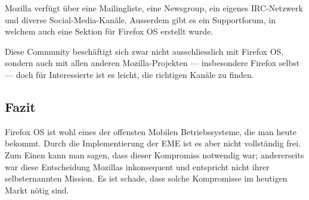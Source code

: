 Mozilla verfügt über eine Mailingliste\thinspace\cite{online:mozilla-mailinglist}, eine Newsgroup\thinspace\cite{online:mozilla-community}, ein eigenes \mbox{IRC-Netzwerk}\thinspace\cite{online:mozilla-community} und diverse \mbox{Social-Media-Kanäle}\thinspace\cite{online:mozilla-google-group}\thinspace\cite{online:mozilla-twitter}. Ausserdem gibt es ein Supportforum\thinspace\cite{online:mozilla-support}, in welchem auch eine Sektion für Firefox OS erstellt wurde. 

Diese Community beschäftigt sich zwar nicht ausschliesslich mit Firefox OS, sondern auch mit allen anderen Mozilla-Projekten --- insbesondere Firefox selbst --- doch für Interessierte ist es leicht, die richtigen Kanäle zu finden.
\newline

\subsection{Fazit}
Firefox OS ist wohl eines der offensten Mobilen Betriebssysteme, die man heute bekommt. Durch die Implementierung der EME ist es aber nicht vollständig frei. Zum Einen kann man sagen, dass dieser Kompromiss notwendig war; andererseits war diese Entscheidung Mozillas inkonsequent und entspricht nicht ihrer selbsternannten Mission. Es ist schade, dass solche Kompromisse im heutigen Markt nötig sind.